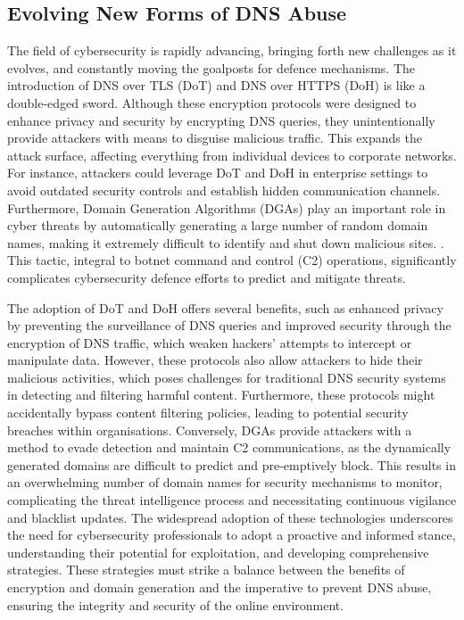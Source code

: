 \subsection{Evolving New Forms of DNS Abuse}

The field of cybersecurity is rapidly advancing, bringing forth new challenges as it evolves, and constantly moving the goalposts for defence mechanisms. The introduction of DNS over TLS (DoT) and DNS over HTTPS (DoH) is like a double-edged sword. Although these encryption protocols were designed to enhance privacy and security by encrypting DNS queries, they unintentionally provide attackers with means to disguise malicious traffic. This expands the attack surface, affecting everything from individual devices to corporate networks. For instance, attackers could leverage DoT and DoH in enterprise settings to avoid outdated security controls and establish hidden communication channels. Furthermore, Domain Generation Algorithms (DGAs) play an important role in cyber threats by automatically generating a large number of random domain names, making it extremely difficult to identify and shut down malicious sites. \cite{kaur2023artificial}. This tactic, integral to botnet command and control (C2) operations, significantly complicates cybersecurity defence efforts to predict and mitigate threats.

The adoption of DoT and DoH offers several benefits, such as enhanced privacy by preventing the surveillance of DNS queries and improved security through the encryption of DNS traffic, which weaken hackers' attempts to intercept or manipulate data. However, these protocols also allow attackers to hide their malicious activities, which poses challenges for traditional DNS security systems in detecting and filtering harmful content. Furthermore, these protocols might accidentally bypass content filtering policies, leading to potential security breaches within organisations.
Conversely, DGAs provide attackers with a method to evade detection and maintain C2 communications, as the dynamically generated domains are difficult to predict and pre-emptively block. This results in an overwhelming number of domain names for security mechanisms to monitor, complicating the threat intelligence process and necessitating continuous vigilance and blacklist updates. The widespread adoption of these technologies underscores the need for cybersecurity professionals to adopt a proactive and informed stance, understanding their potential for exploitation, and developing comprehensive strategies. These strategies must strike a balance between the benefits of encryption and domain generation and the imperative to prevent DNS abuse, ensuring the integrity and security of the online environment.


